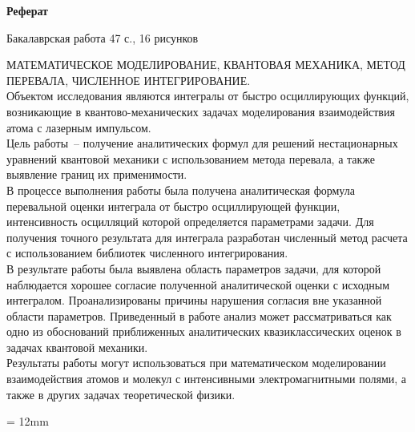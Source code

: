 \documentclass[14pt, a4paper]{article}
\numberwithin{figure}{section}
\numberwithin{equation}{section}
\begin{document}
\newpage%
\addtocounter{page}{1}
\begin{center}
{\normalsize \textbf{Реферат}}
\end{center}

\begin{flushleft}
Бакалаврская работа 47 с., 16 рисунков         \\
\vspace{0.5cm}

МАТЕМАТИЧЕСКОЕ МОДЕЛИРОВАНИЕ, КВАНТОВАЯ МЕХАНИКА, МЕТОД ПЕРЕВАЛА, ЧИСЛЕННОЕ ИНТЕГРИРОВАНИЕ. \\	
\vspace{0.5cm}
Объектом исследования являются интегралы от быстро осциллирующих функций, возникающие в квантово-механических задачах моделирования взаимодействия атома с лазерным импульсом. \\
\vspace{0.5cm}
Цель работы~-- получение аналитических формул для решений нестационарных уравнений квантовой механики с использованием метода перевала, а также выявление границ их применимости.\\
\vspace{0.5cm}
В процессе выполнения работы была получена аналитическая формула перевальной оценки интеграла от быстро осциллирующей функции, интенсивность осцилляций которой определяется параметрами задачи. Для получения точного результата для интеграла разработан численный метод расчета с использованием библиотек численного интегрирования. \\
\vspace{0.5cm}
В результате работы была выявлена область параметров задачи, для которой наблюдается хорошее согласие полученной аналитической оценки с исходным интегралом. Проанализированы причины нарушения согласия вне указанной области параметров. Приведенный в работе анализ может рассматриваться как одно из обоснований приближенных аналитических квазиклассических оценок в задачах квантовой механики. \\
\vspace{0.5cm}
Результаты работы могут использоваться при математическом моделировании взаимодействия атомов и молекул с интенсивными электромагнитными полями, а также в других задачах теоретической физики. 
\end{flushleft}

{}
\parindent = 12mm

\end{document}
